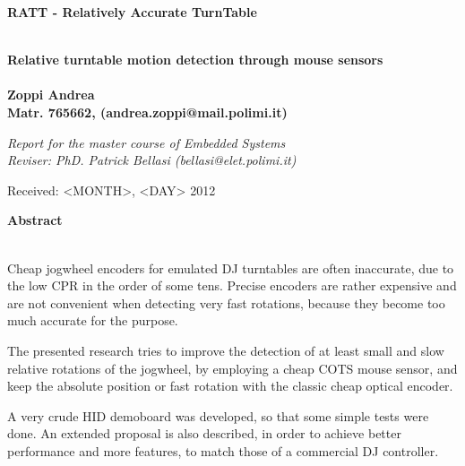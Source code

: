 \documentclass[a4paper,10pt]{article}
\newenvironment*{mytitle}{\begin{LARGE}\bf}{\end{LARGE}\\}%
\newenvironment*{mysubtitle}{\bf}{\\[1.5ex]}%
\newenvironment*{myabstract}{\begin{Large}\bf}{\end{Large}\\[2.5ex]}%
\begin{document}
\newcommand{\TODO}{\textbf{TODO\dots\ }}
\newcommand{\CITEME}{\textbf{[CITEME]}}
\newcommand{\INSFIG}{\textbf{Figure PLACEHOLDER}}
\renewcommand{\thefigure}{\arabic{figure}}
\newcommand{\citef}[1]{\textbf{Figure~\ref{#1}}}


\begin{mytitle}RATT	- Relatively Accurate TurnTable\end{mytitle}
\begin{mysubtitle}Relative turntable motion detection through mouse sensors\end{mysubtitle}
\\
Zoppi Andrea\\
Matr. 765662, (andrea.zoppi@mail.polimi.it)\\
\begin{flushright}
\emph{Report for the master course of Embedded Systems}\\
\emph{Reviser: PhD. Patrick Bellasi (bellasi@elet.polimi.it)}
\end{flushright}

Received: <MONTH>, <DAY> 2012\\
\hspace{10ex}

\begin{myabstract} Abstract \end{myabstract}
Cheap jogwheel encoders for emulated DJ turntables are often inaccurate, due
to the low CPR in the order of some tens. Precise encoders are rather expensive
and are not convenient when detecting very fast rotations, because they become
too much accurate for the purpose.

The presented research tries to improve the detection of at least small and
slow relative rotations of the jogwheel, by employing a cheap COTS mouse sensor,
and keep the absolute position or fast rotation with the classic cheap optical
encoder.

A very crude HID demoboard was developed, so that some simple tests were done.
An extended proposal is also described, in order to achieve better performance
and more features, to match those of a commercial DJ controller.
\end{document}
